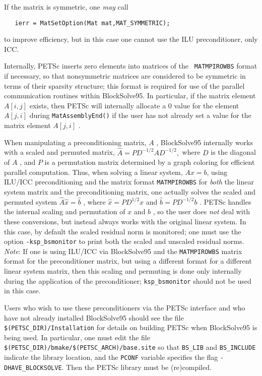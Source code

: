 If the matrix is symmetric, one {\em may} call
\begin{verbatim}
   ierr = MatSetOption(Mat mat,MAT_SYMMETRIC);
\end{verbatim}
to improve efficiency, but in this case one cannot use the ILU 
preconditioner, only ICC.

Internally, PETSc inserts zero elements into matrices of the {\tt
MATMPIROWBS} format if necessary, so that nonsymmetric matrices are
considered to be symmetric in terms of their sparsity structure; this
format is required for use of the parallel communication routines
within BlockSolve95. In particular, if the matrix element $A[i,j]$
exists, then PETSc will internally allocate a 0 value for the element
$ A[j,i] $ during {\tt MatAssemblyEnd()} if the user has not already set
a value for the matrix element $ A[j,i] $ .

When manipulating a preconditioning matrix, $ A $ , BlockSolve95
internally works with a scaled and permuted matrix, $ \hat{A} = P
D^{-1/2} A D^{-1/2},$ where $ D $ is the diagonal of $ A $ , and $ P $ is a
permutation matrix determined by a graph coloring for efficient
parallel computation.  Thus, when solving a linear system, $ Ax=b $,
using ILU/ICC preconditioning and the matrix format {\tt MATMPIROWBS}
for {\em both} the linear system matrix and the preconditioning
matrix, one actually solves the scaled and permuted system $ \hat{A}
\hat{x} = \hat{b} $ , where $ \hat{x} = P D^{1/2} x $ and $\hat{b} = P
D^{-1/2} b$ .  PETSc handles the internal scaling and permutation of
$ x $ and $ b $ , so the user does {\em not} deal with these conversions, 
but instead always works with the original linear system.  In
this case, by default the scaled residual norm is monitored; one must use the
option {\tt -ksp\_bsmonitor}  to print both the
scaled and unscaled residual norms. {\em Note}: If one is using ILU/ICC via
BlockSolve95 and the {\tt MATMPIROWBS} matrix format for the 
preconditioner matrix, but using a different format for a different
linear system matrix, then this scaling and permuting is done only
internally during the application of the preconditioner; 
{\tt ksp\_bsmonitor} should not be used in this case.

Users who wish to use these preconditioners via the PETSc interface and
who have not already installed BlockSolve95 should see
the file {\tt \$(PETSC\_DIR)/Installation} for details on building
PETSc when BlockSolve95 is being used.  In particular, one must edit
the file {\tt \$(PETSC\_DIR)/bmake/\$(PETSC\_ARCH)/base.site} so that
{\tt BS\_LIB} and {\tt BS\_INCLUDE} indicate the library location, and
the {\tt PCONF} variable specifies the flag {\tt -DHAVE\_BLOCKSOLVE}.
Then the PETSc library must be (re)compiled.


